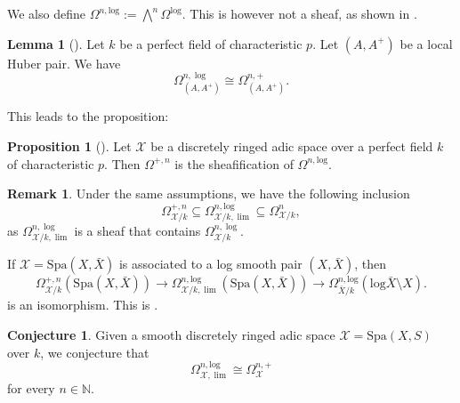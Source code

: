 \documentclass{amsart}
\def\Spa{\textrm{Spa}}
\theoremstyle{definition}
\newtheorem{proposition}[theorem]{Proposition}
\newtheorem{lemma}[theorem]{Lemma}
\newtheorem{remark}[theorem]{Remark}
\newtheorem{conjecture}[theorem]{Conjecture}
\newcommand\llog{\mathrm{log}}
\numberwithin{equation}{section}
\begin{document}
We also define $\Omega^{n,\llog}:=\bigwedge^n\Omega^{\llog}$.
This is however not a sheaf, as shown in \cite[Example 4.4.]{LogDiff}.
\begin{lemma}[{\cite[Lemma 7.3.]{LogDiff}}]\label{lem:plusisLog}
	Let $k$ be a perfect field of characteristic $p$. Let $(A,A^+)$ be a local Huber pair.
	We have 
	\[
	\Omega^{n,\log}_{(A,A^+)}\cong \Omega^{n,+}_{(A,A^+)}.
	\]
\end{lemma}

This leads to the proposition:
\begin{proposition}[{\cite[Proposition 7.11]{LogDiff}}]
	Let $\mathcal{X}$ be a discretely ringed adic space over a perfect field $k$ of characteristic $p$. Then $\Omega^{+,n}$ is the sheafification of $\Omega^{n,\llog}$.
\end{proposition}

\begin{remark}
	Under the same assumptions, we have the following inclusion 
	\[
	\Omega^{+,n}_{\mathcal{X}/k}\subseteq \Omega^{n,\llog}_{\mathcal{X}/k,\lim} \subseteq \Omega^{n}_{\mathcal{X}/k},
	\]
	as $\Omega^{n,\log}_{\mathcal{X}/k,\lim}$ is a sheaf that contains $\Omega^{n,\log}_{\mathcal{X}/k}$.
\end{remark} 


If $\mathcal{X}=\Spa(X,\bar{X})$ is associated to a log smooth pair $(X,\bar{X})$, then
\[
\Omega^{+,n}_{\mathcal{X}/k}(\Spa(X,\bar{X}))\to  \Omega^{n,\llog}_{\mathcal{X}/k,\lim}(\Spa(X,\bar{X}))\to \Omega^{n,\llog}_{\bar{X}/k}(\llog \bar{X}\setminus X).
\]
is an isomorphism. This is \cite[Theorem 8.12]{LogDiff}.
\begin{conjecture}\label{Hypothesis_L}
	Given a smooth discretely ringed adic space $\mathcal{X}=\Spa(X,S)$ over $k$, we conjecture that 
	\[
	\Omega_{\mathcal{X},\lim}^{n,\llog}\cong \Omega^{n,+}_{\mathcal{X}} 
	\] 	
	for every $n\in \mathbb{N}$. 
\end{conjecture}
\end{document}
